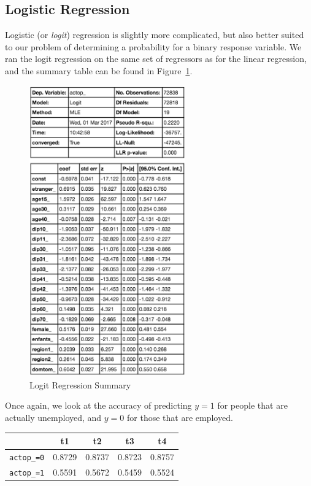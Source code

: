 \subsection{Logistic Regression}
Logistic (or \textit{logit}) regression is slightly more complicated, but also better suited to our problem of determining a probability for a binary response variable. We ran the logit regression on the same set of regressors as for the linear regression, and the summary table can be found in Figure~\ref{fig:logit_regression_summary}.

\begin{figure}
    \centering
    \includegraphics[width=0.6\textwidth]{img/logit_regression_summary}
    \caption{Logit Regression Summary}
    \label{fig:logit_regression_summary}
\end{figure}

Once again, we look at the accuracy of predicting $y=1$ for people that are actually unemployed, and $y=0$ for those that are employed.

\begin{center}
    \begin{tabular}{lcccc}
        \hline
                           & t1     & t2     & t3     & t4     \\
        \hline
        \texttt{actop\_=0} & 0.8729 & 0.8737 & 0.8723 & 0.8757 \\
        \texttt{actop\_=1} & 0.5591 & 0.5672 & 0.5459 & 0.5524 \\
    \end{tabular}
\end{center}

